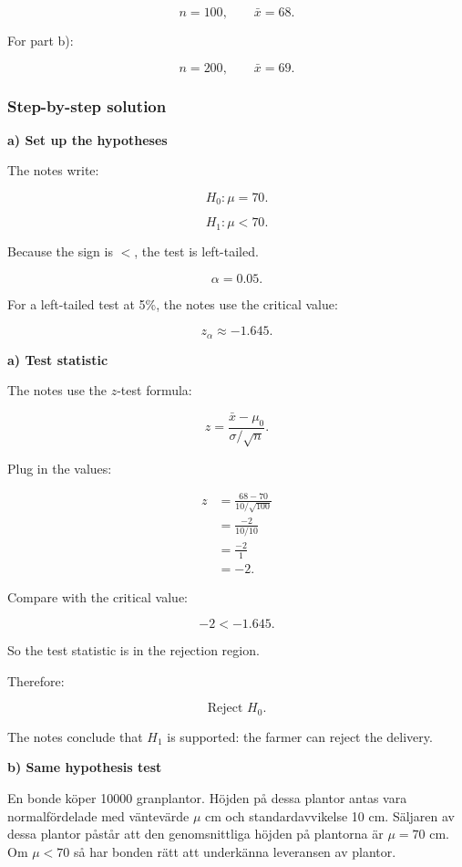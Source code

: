 \documentclass[10pt]{article}
\begin{document}
\[
n=100,
\qquad
\bar{x}=68.
\]

For part b):

\[
n=200,
\qquad
\bar{x}=69.
\]

\subsubsection*{Step-by-step solution}

\textbf{a) Set up the hypotheses}

The notes write:

\[
H_0:\mu=70.
\]

\[
H_1:\mu<70.
\]

Because the sign is \(<\), the test is left-tailed.

\[
\alpha=0.05.
\]

For a left-tailed test at 5\%,
the notes use the critical value:

\[
z_\alpha\approx -1.645.
\]

\textbf{a) Test statistic}

The notes use the \(z\)-test formula:

\[
z=
\frac{\bar{x}-\mu_0}
{\sigma/\sqrt{n}}.
\]

Plug in the values:

\begin{align*}
z
&=
\frac{68-70}
{10/\sqrt{100}} \\[2mm]
&=
\frac{-2}{10/10} \\[2mm]
&=
\frac{-2}{1} \\[2mm]
&=-2.
\end{align*}

Compare with the critical value:

\[
-2<-1.645.
\]

So the test statistic is in the rejection region.

Therefore:

\[
\text{Reject } H_0.
\]

The notes conclude that \(H_1\) is supported:
the farmer can reject the delivery.

\textbf{b) Same hypothesis test}

En bonde köper 10000 granplantor.
Höjden på dessa plantor antas vara normalfördelade
med väntevärde \(\mu\) cm och standardavvikelse
10 cm.
Säljaren av dessa plantor påstår att den genomsnittliga
höjden på plantorna är \(\mu=70\) cm.
Om \(\mu<70\) så har bonden rätt att underkänna
leveransen av plantor.
\end{document}
